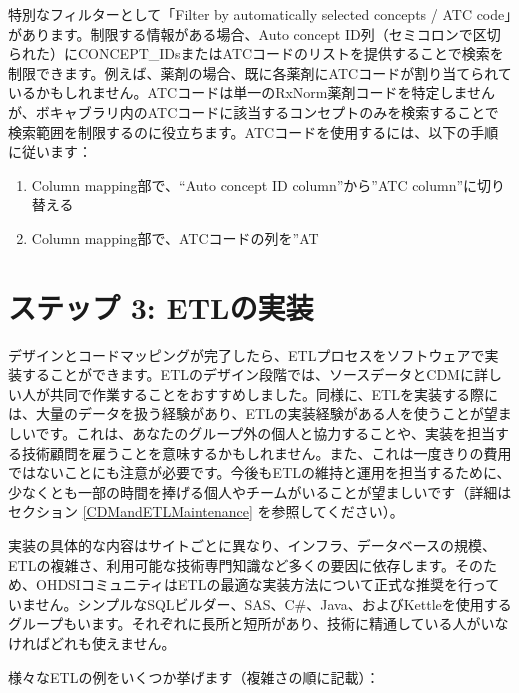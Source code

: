 \documentclass[
  11pt]{book}
\providecommand{\tightlist}{%
  \setlength{\itemsep}{0pt}\setlength{\parskip}{0pt}}
\theoremstyle{definition}
\theoremstyle{definition}
\theoremstyle{definition}
\theoremstyle{definition}
\theoremstyle{remark}
\begin{document}
特別なフィルターとして「Filter by automatically selected concepts / ATC code」があります。制限する情報がある場合、Auto concept ID列（セミコロンで区切られた）にCONCEPT\_IDsまたはATCコードのリストを提供することで検索を制限できます。例えば、薬剤の場合、既に各薬剤にATCコードが割り当てられているかもしれません。ATCコードは単一のRxNorm薬剤コードを特定しませんが、ボキャブラリ内のATCコードに該当するコンセプトのみを検索することで検索範囲を制限するのに役立ちます。ATCコードを使用するには、以下の手順に従います：

\begin{enumerate}
\def\labelenumi{\arabic{enumi}.}
\tightlist
\item
  Column mapping部で、``Auto concept ID column''から''ATC column''に切り替える
\item
  Column mapping部で、ATCコードの列を''AT
\end{enumerate}

\section{ステップ 3: ETLの実装}\label{ux30b9ux30c6ux30c3ux30d7-3-etlux306eux5b9fux88c5}

デザインとコードマッピングが完了したら、ETLプロセスをソフトウェアで実装することができます。ETLのデザイン段階では、ソースデータとCDMに詳しい人が共同で作業することをおすすめしました。同様に、ETLを実装する際には、大量のデータを扱う経験があり、ETLの実装経験がある人を使うことが望ましいです。これは、あなたのグループ外の個人と協力することや、実装を担当する技術顧問を雇うことを意味するかもしれません。また、これは一度きりの費用ではないことにも注意が必要です。今後もETLの維持と運用を担当するために、少なくとも一部の時間を捧げる個人やチームがいることが望ましいです（詳細はセクション \ref{CDMandETLMaintenance} を参照してください）。

実装の具体的な内容はサイトごとに異なり、インフラ、データベースの規模、ETLの複雑さ、利用可能な技術専門知識など多くの要因に依存します。そのため、OHDSIコミュニティはETLの最適な実装方法について正式な推奨を行っていません。シンプルなSQLビルダー、SAS、C\#、Java、およびKettleを使用するグループもいます。それぞれに長所と短所があり、技術に精通している人がいなければどれも使えません。

様々なETLの例をいくつか挙げます（複雑さの順に記載）：
\end{document}
